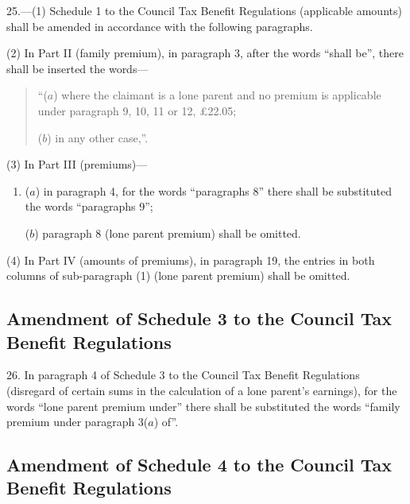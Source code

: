 \documentclass[12pt,a4paper]{article}
\begin{document}
25.—(1) Schedule 1 to the Council Tax Benefit Regulations (applicable amounts) shall be amended in accordance with the following paragraphs.

(2) In Part II (family premium), in paragraph 3, after the words “shall be”, there shall be inserted the words—
\begin{quotation}
“($a$) where the claimant is a lone parent and no premium is applicable under paragraph 9, 10, 11 or 12, £22.05;

($b$) in any other case,”.
\end{quotation}

(3) In Part III (premiums)—
\begin{enumerate}\item[]
($a$) in paragraph 4, for the words “paragraphs 8” there shall be substituted the words “paragraphs 9”;

($b$) paragraph 8 (lone parent premium) shall be omitted.
\end{enumerate}

(4) In Part IV (amounts of premiums), in paragraph 19, the entries in both columns of sub-paragraph (1) (lone parent premium) shall be omitted.

\subsection[26. Amendment of Schedule 3 to the Council Tax Benefit Regulations]{Amendment of Schedule 3 to the Council Tax Benefit Regulations}

26.  In paragraph 4 of Schedule 3 to the Council Tax Benefit Regulations (disregard of certain sums in the calculation of a lone parent’s earnings), for the words “lone parent premium under” there shall be substituted the words “family premium under paragraph 3($a$) of”.

\subsection[27. Amendment of Schedule 4 to the Council Tax Benefit Regulations]{Amendment of Schedule 4 to the Council Tax Benefit Regulations}
\end{document}
